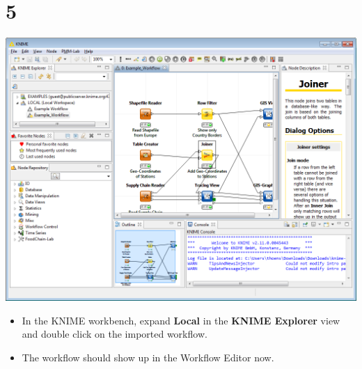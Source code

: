 \documentclass{beamer}
\begin{document}
\section{5}
\begin{frame}
	\begin{center}
  		\includegraphics[height=0.6\textheight]{5.png}
	\end{center}
	\begin{itemize}
		\item In the KNIME workbench, expand \textbf{Local} in the \textbf{KNIME Explorer} view and double click on the imported workflow.
		\item The workflow should show up in the Workflow Editor now.
	\end{itemize}
\end{frame}
\end{document}
